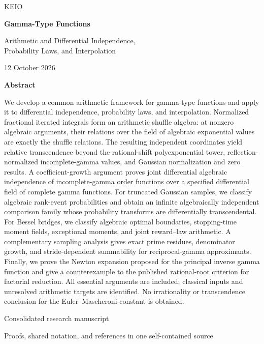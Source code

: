 \documentclass[11pt,a4paper]{article}
\theoremstyle{definition}
\theoremstyle{remark}
\numberwithin{equation}{section}
\begin{document}
\hypersetup{pageanchor=false}
\begin{titlepage}
\centering
\vspace*{12mm}
{\Large\sffamily\color{navy} KEIO\par}
\vspace{13mm}
{\huge\bfseries\color{navy} Gamma-Type Functions\par}
\vspace{6mm}
{\Large Arithmetic and Differential Independence,\\[3pt]
Probability Laws, and Interpolation\par}
\vspace{10mm}
{\large 12 October 2026\par}
\vspace{12mm}
\begin{minipage}{0.94\textwidth}
\small
\begin{center}\textbf{Abstract}\end{center}
We develop a common arithmetic framework for gamma-type functions and
apply it to differential independence, probability laws, and interpolation.
Normalized fractional iterated integrals form an arithmetic shuffle
algebra: at nonzero algebraic arguments, their relations over the field
of algebraic exponential values are exactly the shuffle relations.
The resulting independent coordinates yield relative transcendence beyond
the rational-shift polyexponential tower, reflection-normalized
incomplete-gamma values, and Gaussian normalization and zero results.
A coefficient-growth argument proves joint differential algebraic
independence of incomplete-gamma order functions over a specified
differential field of complete gamma functions. For truncated Gaussian
samples, we classify algebraic rank-event probabilities and obtain an
infinite algebraically independent comparison family whose probability
transforms are differentially transcendental. For Bessel bridges, we
classify algebraic optimal boundaries, stopping-time moment fields,
exceptional moments, and joint reward--law arithmetic. A complementary
sampling analysis gives exact prime residues, denominator growth, and
stride-dependent summability for reciprocal-gamma approximants. Finally,
we prove the Newton expansion proposed for the principal inverse gamma
function and give a counterexample to the published rational-root
criterion for factorial reduction. All essential arguments are included;
classical inputs and unresolved arithmetic targets are identified.
No irrationality or transcendence conclusion for the Euler--Mascheroni
constant is obtained.
\end{minipage}
\vfill
{\small Consolidated research manuscript\par}
\vspace{3mm}
{\small Proofs, shared notation, and references in one self-contained source\par}
\end{titlepage}
\hypersetup{pageanchor=true}
\tableofcontents
\clearpage
{}
\end{document}
